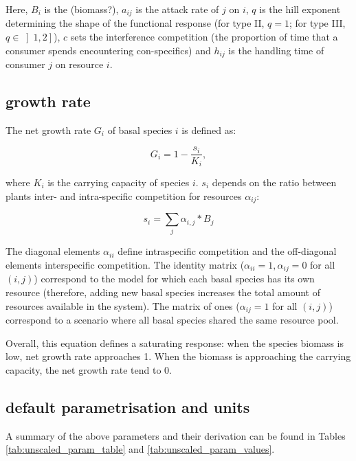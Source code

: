 \documentclass[12pt,a4paper]{article}
\begin{document}
Here, $B_i$ is the (biomass?), $a_{ij}$ is the attack rate of $j$ on $i$, $q$ is the hill exponent determining the shape of the functional response (for type II, $q = 1$; for type III, $q \in \left]1,2\right]$), $c$ sets the interference competition (the proportion of time that a consumer spends encountering con-specifics) and $h_{ij}$ is the handling time of consumer $j$ on resource $i$. 

\subsection{growth rate}

The net growth rate $G_i$ of basal species $i$ is defined as:

\begin{equation}
G_i = 1 - \frac{s_i}{K_i},
\end{equation}

where $K_i$ is the carrying capacity of species $i$. $s_i$ depends on the ratio between plants inter- and intra-specific competition for resources $\alpha_{ij}$:

\begin{equation}
s_i = \sum_j \alpha_{i,j}*B_j
\end{equation}

The diagonal elements $\alpha_{ii}$ define intraspecific competition and the off-diagonal elements interspecific competition. The identity matrix ($\alpha_{ii} = 1, \alpha_{ij} = 0$ for all $(i,j)$) correspond to the model for which each basal species has its own resource (therefore, adding new basal species increases the total amount of resources available in the system). The matrix of ones ($\alpha_{ij} = 1$ for all $(i,j)$) correspond to a scenario where all basal species shared the same resource pool. 

Overall, this equation defines a saturating response: when the species biomass is low, net growth rate approaches 1. When the biomass is approaching the carrying capacity, the net growth rate tend to 0.

\subsection{default parametrisation and units}
A summary of the above parameters and their derivation can be found in Tables \ref{tab:unscaled_param_table} and \ref{tab:unscaled_param_values}.
\end{document}
